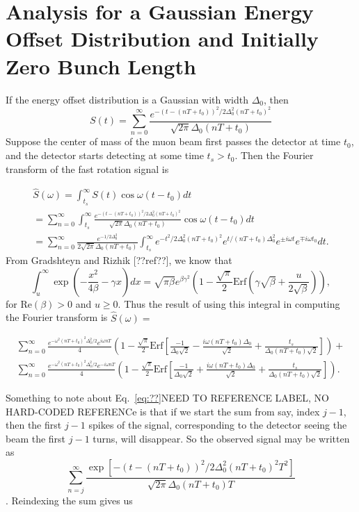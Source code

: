 \section{Analysis for a Gaussian Energy Offset Distribution and Initially Zero Bunch Length}

If the energy offset distribution is a Gaussian with width $\Delta_0$, then \[S(t)=\sum^{\infty}_{n=0}\frac{e^{-(t-(nT+t_0))^2/2\Delta^2_0(nT+t_0)^2}}{\sqrt{2\pi}\Delta_0(nT+t_0)}\] Suppose the center of mass of the muon beam first passes the detector at time $t_0$, and the detector starts detecting at some time $t_s>t_0$. Then the Fourier transform of the fast rotation signal is

\begin{gather}
\hat{S}(\omega)=\int^{\infty}_{t_s}S(t)\cos\omega(t-t_0) dt \nonumber \\
=\sum^{\infty}_{n=0}\int^{\infty}_{t_s}\frac{e^{-(t-(nT+t_0))^2/2\Delta^2_0(nT+t_0)^2}}{\sqrt{2\pi}\Delta_0(nT+t_0)}\cos\omega(t-t_0)dt \nonumber \\ 
=\sum^{\infty}_{n=0}\frac{e^{-1/2\Delta^2_0}}{2\sqrt{2\pi}\Delta_0(nT+t_0)}\int^{\infty}_{t_s}e^{-t^2/2\Delta^2_0(nT+t_0)^2}e^{t/(nT+t_0)\Delta^2_0}e^{\pm i\omega t}e^{\mp i\omega t_0}dt.
\end{gather}
From Gradshteyn and Rizhik [??ref??], we know that 
\begin{equation}
\int^{\infty}_u\exp\left(-\frac{x^2}{4\beta}-\gamma x\right)dx=\sqrt{\pi\beta}e^{\beta\gamma^2}\left(1-\frac{\sqrt{\pi}}{2}\text{Erf}\left(\gamma\sqrt{\beta}+\frac{u}{2\sqrt{\beta}}\right)\right),
\end{equation}
for $\text{Re}(\beta)>0$ and $u\geq0$. Thus the result of using this integral in computing the Fourier transform is $\hat{S}(\omega)=$ 

\begin{gather}
\sum^{\infty}_{n=0}\frac{e^{-\omega^2(nT+t_0)^2\Delta^2_0/2}e^{i\omega nT}}{4}\left(1-\frac{\sqrt{\pi}}{2}\text{Erf}\left[\frac{-1}{\Delta_0\sqrt{2}}-\frac{i\omega (nT+t_0)\Delta_0}{\sqrt{2}}+\frac{t_s}{\Delta_0(nT+t_0)\sqrt{2}}\right]\right)+ \nonumber \\
\sum^{\infty}_{n=0}\frac{e^{-\omega^2(nT+t_0)^2\Delta^2_0/2}e^{-i\omega nT}}{4}\left(1-\frac{\sqrt{\pi}}{2}\text{Erf}\left[\frac{-1}{\Delta_0\sqrt{2}}+\frac{i\omega (nT+t_0)\Delta_0}{\sqrt{2}}+\frac{t_s}{\Delta_0(nT+t_0)\sqrt{2}}\right]\right).
\end{gather}

Something to note about Eq.~\ref{eq:??}NEED TO REFERENCE LABEL, NO HARD-CODED REFERENCe  
is that if we start the sum from say, index $j-1$, then the first $j-1$ spikes of the signal, 
corresponding to the detector seeing the beam the first $j-1$ turns, will disappear. 
So the observed signal may be written as 
\[\sum^{\infty}_{n=j}\frac{\exp[-(t-(nT+t_0))^2/2\Delta^2_0(nT+t_0)^2T^2]}{\sqrt{2\pi}\Delta_0(nT+t_0)T}\]. 
Reindexing the sum gives us 

